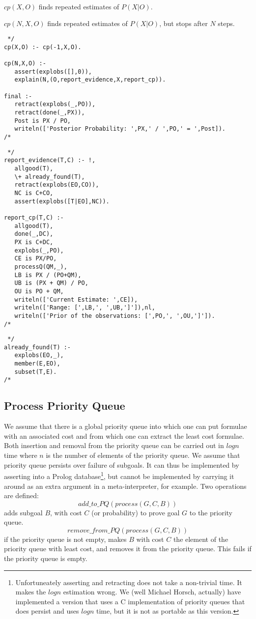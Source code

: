 $cp(X,O)$ finds repeated estimates of $P(X|O)$.


$cp(N,X,O)$ finds repeated estimates of $P(X|O)$, but stops after $N$ steps.

\begin{verbatim} */
cp(X,O) :- cp(-1,X,O).

cp(N,X,O) :-
   assert(explobs([],0)),
   explain(N,(O,report_evidence,X,report_cp)).

final :-
   retract(explobs(_,PO)),
   retract(done(_,PX)),
   Post is PX / PO,
   writeln(['Posterior Probability: ',PX,' / ',PO,' = ',Post]).
/* \end{verbatim}

\begin{verbatim} */
report_evidence(T,C) :- !,
   allgood(T),
   \+ already_found(T),
   retract(explobs(EO,CO)),
   NC is C+CO,
   assert(explobs([T|EO],NC)).

report_cp(T,C) :-
   allgood(T),
   done(_,DC),
   PX is C+DC,
   explobs(_,PO),
   CE is PX/PO,
   processQ(QM,_),
   LB is PX / (PO+QM),
   UB is (PX + QM) / PO,
   OU is PO + QM,
   writeln(['Current Estimate: ',CE]),
   writeln(['Range: [',LB,', ',UB,']']),nl,
   writeln(['Prior of the observations: [',PO,', ',OU,']']).
/* \end{verbatim}

\begin{verbatim} */
already_found(T) :-
   explobs(EO,_),
   member(E,EO),
   subset(T,E).
/* \end{verbatim}

\subsection{Process Priority Queue}
We assume that there is a global priority queue into which one can put
formulae with an associated cost and from which one can extract the
least cost formulae. Both insertion and removal from the priority queue
can be carried out in $log n$ time where $n$ is the number of elements
of the priority queue.  We assume that priority queue persists
over failure of subgoals. It can thus be implemented by asserting into
a Prolog database\footnote{Unfortuneately asserting and retracting does not take a non-trivial time. It makes the $log n$ estimation wrong. We (well 
Michael Horsch, actually) have implemented a version that uses a C 
implementation of priority queues that does persist and uses $log n$ time, but 
it is not as portable as this version.}, but cannot be implemented by carrying 
it around as an extra argument in a meta-interpreter, for example.
Two operations are defined:
\[add\_to\_PQ(process(G,C,B))\]
adds subgoal $B$, with cost $C$ (or probability) to prove goal $G$ to the
priority queue.
\[remove\_from\_PQ(process(G,C,B))\]
if the priority queue is not empty, makes $B$ with cost $C$ the
element of the priority queue with least cost, and removes it from the
priority queue. This fails if the priority queue is empty.

